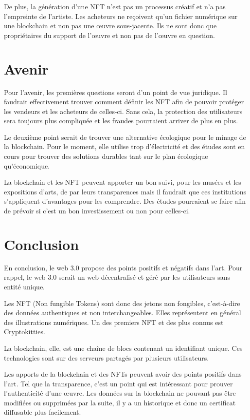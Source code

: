 \documentclass[11pt]{article}
\begin{document}
De plus, la génération d'une NFT n'est pas un processus créatif et n'a pas l'empreinte de l'artiste. Les acheteurs ne reçoivent qu'un fichier numérique sur une blockchain et non pas une œuvre sous-jacente. Ils ne sont donc que propriétaires du support de l'œuvre et non pas de l'œuvre en question.  \cite{meghraoui_les_2022}

\section{Avenir} %
Pour l'avenir, les premières questions seront d'un point de vue juridique. Il faudrait effectivement trouver comment définir les NFT afin de pouvoir protéger les vendeurs et les acheteurs de celles-ci. Sans cela, la protection des utilisateurs sera toujours plus compliquée et les fraudes pourraient arriver de plus en plus. 

Le deuxième point serait de trouver une alternative écologique pour le minage de la blockchain. Pour le moment, elle utilise trop d'électricité et des études sont en cours pour trouver des solutions durables tant sur le plan écologique qu'économique. 

La blockchain et les NFT peuvent apporter un bon suivi, pour les musées et les expositions d'arts, de par leurs transparences mais il faudrait que ces institutions s'appliquent d'avantages pour les comprendre. Des études pourraient se faire afin de prévoir si c'est un bon investissement ou non pour celles-ci. 
\section{Conclusion} %
En conclusion, le web 3.0 propose des points positifs et négatifs dans l'art. 
Pour rappel, le web 3.0 serait un web décentralisé et géré par les utilisateurs sans entité unique.

Les NFT (Non fungible Tokens) sont donc des jetons non fongibles, c'est-à-dire des données authentiques et non interchangeables. Elles représentent en général des illustrations numériques. Un des premiers NFT et des plus connus est Cryptokitties. 

La blockchain, elle, est une chaîne de blocs contenant un identifiant unique. Ces technologies sont sur des serveurs partagés par plusieurs utilisateurs. 

Les apports de la blockchain et des NFTs peuvent avoir des points positifs dans l'art. Tel que la transparence, c'est un point qui est intéressant pour prouver l'authenticité d'une œuvre. Les données sur la blockchain ne pouvant pas être modifiées ou supprimées par la suite, il y a un historique et donc un certificat diffusable plus facilement. 
\end{document}
